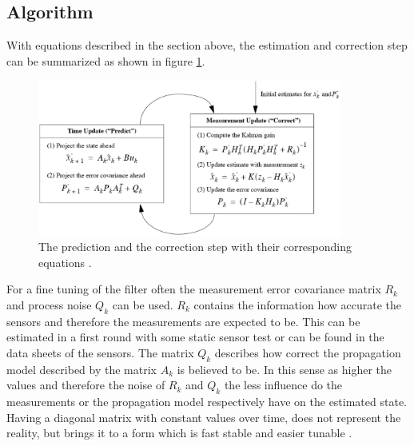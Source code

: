 \subsection*{Algorithm}
With equations described in the section above, the estimation and correction step can be summarized as shown in figure \ref{equation_kalman}.
\begin{figure}[h]
\begin{center}
\includegraphics[width=10cm]{pictures/equation_kalman.eps}
\caption{The prediction and the correction step with their corresponding equations \cite{welch1997}. }
\label{equation_kalman}
\end{center}
\end{figure} 
For a fine tuning of the filter often the measurement error covariance matrix $R_k$ and process noise $Q_k$ can be used. $R_k$ contains the information how accurate the sensors and therefore the measurements are expected to be. This can be estimated in a first round with some static sensor test or can be found in the data sheets of the sensors. The matrix $Q_k$ describes how correct the propagation model described by the matrix $A_k$ is believed to be. In this sense as higher the values and therefore the noise of $R_k$ and $Q_k$ the less influence do the measurements or the propagation model respectively have on the estimated state. Having a diagonal matrix with constant values over time, does not represent the reality, but brings it to a form which is fast stable and easier tunable \cite{welch1997}. 

